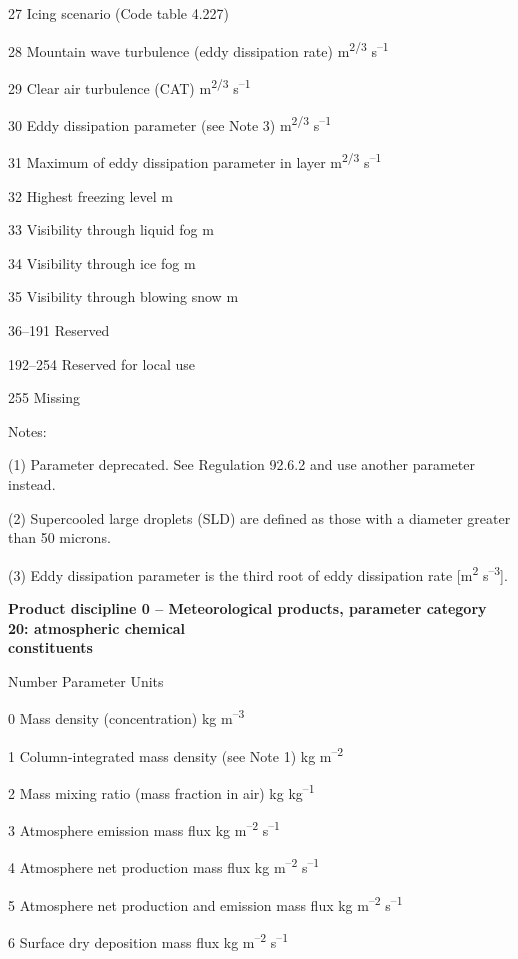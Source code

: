 27 Icing scenario (Code table 4.227)

28 Mountain wave turbulence (eddy dissipation rate) m\textsuperscript{2/3} s\textsuperscript{--1}

29 Clear air turbulence (CAT) m\textsuperscript{2/3} s\textsuperscript{--1}

30 Eddy dissipation parameter (see Note 3) m\textsuperscript{2/3} s\textsuperscript{--1}

31 Maximum of eddy dissipation parameter in layer m\textsuperscript{2/3} s\textsuperscript{--1}

32 Highest freezing level m

33 Visibility through liquid fog m

34 Visibility through ice fog m

35 Visibility through blowing snow m

36--191 Reserved

192--254 Reserved for local use

255 Missing

Notes:

(1) Parameter deprecated. See Regulation 92.6.2 and use another parameter instead.

(2) Supercooled large droplets (SLD) are defined as those with a diameter greater than 50 microns.

(3) Eddy dissipation parameter is the third root of eddy dissipation rate {[}m\textsuperscript{2} s\textsuperscript{--3}{]}.

\textbf{Product discipline 0 -- Meteorological products, parameter category 20: atmospheric chemical\\
constituents}

Number Parameter Units

0 Mass density (concentration) kg m\textsuperscript{--3}

1 Column-integrated mass density (see Note 1) kg m\textsuperscript{--2}

2 Mass mixing ratio (mass fraction in air) kg kg\textsuperscript{--1}

3 Atmosphere emission mass flux kg m\textsuperscript{--2} s\textsuperscript{--1}

4 Atmosphere net production mass flux kg m\textsuperscript{--2} s\textsuperscript{--1}

5 Atmosphere net production and emission mass flux kg m\textsuperscript{--2} s\textsuperscript{--1}

6 Surface dry deposition mass flux kg m\textsuperscript{--2} s\textsuperscript{--1}

